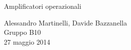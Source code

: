 \begin{center}

     	{\huge Amplificatori operazionali}

     	\vspace{0.2cm}
	\vspace{0.3cm}

      	{\large Alessandro Martinelli, Davide Bazzanella} \\
		{ Gruppo B10} \\
	
	\vspace{0.1cm}
      	{ 27 maggio 2014}

\end{center}
